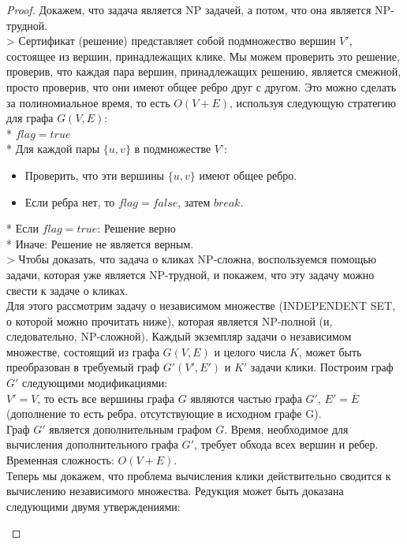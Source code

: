     \begin{proof}
         Докажем, что задача является NP задачей, а потом, что она является NP-трудной.\\
         > Сертификат (решение) представляет собой подмножество вершин $V'$, состоящее из вершин, принадлежащих клике. Мы можем проверить это решение, проверив, что каждая пара вершин, принадлежащих решению, является смежной, просто проверив, что они имеют общее ребро друг с другом. Это можно сделать за полиномиальное время, то есть $O(V + E)$, используя следующую стратегию для графа $G(V, E)$:\\
         * $flag = true$\\
         * Для каждой пары $\{u, v\}$ в подмножестве $V’$:
         \begin{itemize}
         \item Проверить, что эти вершины $\{u, v\}$ имеют общее ребро.
        \item Если ребра нет, то $flag = false$, затем $break$.
        \end{itemize}
         * Если $flag = true$: Решение верно\\
         * Иначе: Решение не является верным.\\
         > Чтобы доказать, что задача о кликах NP-сложна, воспользуемся помощью задачи, которая уже является NP-трудной, и покажем, что эту задачу можно свести к задаче о кликах.\\
         Для этого рассмотрим задачу о независимом множестве (INDEPENDENT SET, о которой можно прочитать ниже), которая является NP-полной (и, следовательно, NP-сложной). Каждый экземпляр задачи о независимом множестве, состоящий из графа $G(V, E)$ и целого числа $K$, может быть преобразован в требуемый граф $G'(V', E')$ и $K'$ задачи клики. Построим граф $G'$ следующими модификациями:\\
         $V' = V$, то есть все вершины графа $G$ являются частью графа $G'$, $E'= \overline{E}$ (дополнение то есть ребра, отсутствующие в исходном графе G).\\
         Граф $G'$ является дополнительным графом $G$. Время, необходимое для вычисления дополнительного графа $G'$, требует обхода всех вершин и ребер.
        Временная сложность: $O(V+E)$.\\
        Теперь мы докажем, что проблема вычисления клики действительно сводится к вычислению независимого множества. Редукция может быть доказана следующими двумя утверждениями:\\
        \begin{itemize}

\end{itemize}
\end{proof}
